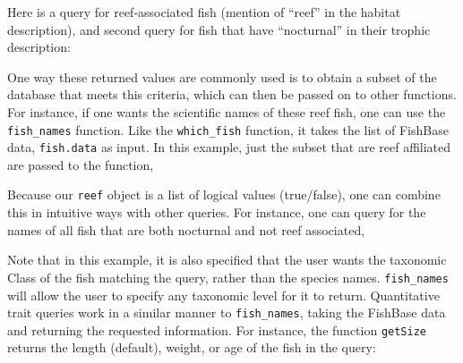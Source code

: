 Here is a query for reef-associated fish (mention of ``reef'' in the
habitat description), and second query for fish that have ``nocturnal''
in their trophic description:

\begin{Shaded}
\begin{Highlighting}[]
\NormalTok{(}\NormalTok{, }
\NormalTok{(}\NormalTok{, }
\end{Highlighting}
\end{Shaded}
One way these returned values are commonly used is to obtain a subset of
the database that meets this criteria, which can then be passed on to
other functions. For instance, if one wants the scientific names of
these reef fish, one can use the \texttt{fish\_names} function. Like the
\texttt{which\_fish} function, it takes the list of FishBase data,
\texttt{fish.data} as input. In this example, just the subset that are
reef affiliated are passed to the function,

\begin{Shaded}
\begin{Highlighting}[]
\end{Highlighting}
\end{Shaded}
Because our \texttt{reef} object is a list of logical values
(true/false), one can combine this in intuitive ways with other queries.
For instance, one can query for the names of all fish that are both
nocturnal and not reef associated,

\begin{Shaded}
\begin{Highlighting}[]
\NormalTok{)}
\end{Highlighting}
\end{Shaded}
Note that in this example, it is also specified that the user wants the
taxonomic Class of the fish matching the query, rather than the species
names. \texttt{fish\_names} will allow the user to specify any taxonomic
level for it to return. Quantitative trait queries work in a similar
manner to \texttt{fish\_names}, taking the FishBase data and returning
the requested information. For instance, the function \texttt{getSize}
returns the length (default), weight, or age of the fish in the query:

